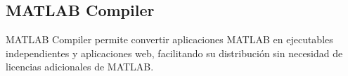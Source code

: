 \subsection{MATLAB Compiler}\label{matlab-compiler}

MATLAB Compiler permite convertir aplicaciones MATLAB en ejecutables independientes y aplicaciones web, facilitando su distribución sin necesidad de licencias adicionales de MATLAB. 

